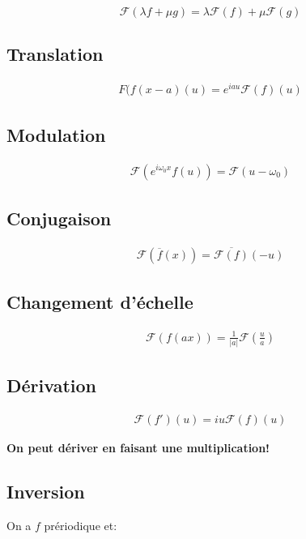 \documentclass[a4paper,11pt]{article}
\begin{document}
$$ \mathcal{F}(\lambda f + \mu g) = \lambda \mathcal{F}(f) + \mu \mathcal{F}(g) $$

\subsection{Translation}

\begin{align*}
  F(f(x-a)(u) = e^{iau} \mathcal{F}(f)(u)
\end{align*}

\subsection{Modulation}

\begin{align*}
\mathcal{F}(e^{i\omega_0 x} f(u)) = \mathcal{F} (u - \omega_0)
\end{align*}

\subsection{Conjugaison}
\begin{align*}
  \mathcal{F}(\overline{f}(x)) = \overline{\mathcal{F}(f)}(-u)
\end{align*}

\subsection{Changement d'échelle}
\begin{align*}
  \mathcal{F}(f(ax)) = \frac{1}{|a|} \mathcal{F} \left( \frac{u}{a} \right)
\end{align*}

\subsection{Dérivation}
\begin{align*}
  \mathcal{F}(f')(u) = i u \mathcal{F}(f)(u)
\end{align*}

\textbf{On peut dériver en faisant une multiplication!}

\subsection{Inversion}

On a $f$ prériodique et:
\end{document}
